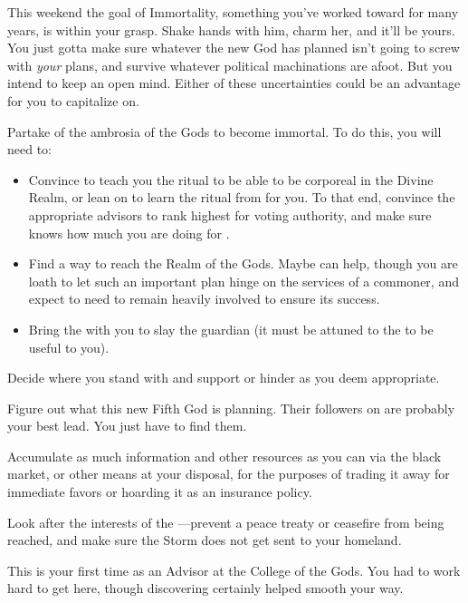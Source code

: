 \documentclass[char]{GL2020}
\begin{document}
This weekend the goal of Immortality, something you’ve worked toward for many years, is within your grasp. Shake hands with him, charm her, and it’ll be yours. You just gotta make sure whatever the new God has planned isn’t going to screw with \emph{your} plans, and survive whatever political machinations are afoot. But you intend to keep an open mind. Either of these uncertainties could be an advantage for you to capitalize on.


\begin{itemz}
	\item Partake of the ambrosia of the Gods to become immortal. To do this, you will need to:
	\begin{itemize}
		\item Convince \cDisney{} to teach you the ritual to be able to be corporeal in the Divine Realm, or lean on \cPirateChild{} to learn the ritual from \cDisney{\them} for you. To that end, convince the appropriate advisors to rank \cDisney{} highest for voting authority, and make sure \cDisney{} knows how much you are doing for \cDisney{\them}.
		\item Find a way to reach the Realm of the Gods. Maybe \cCurse{} can help, though you are loath to let such an important plan hinge on the services of a commoner, and expect to need to remain heavily involved to ensure its success.
		\item Bring the \iScythe{} with you to slay the guardian (it must be attuned to the \pFarm{} to be useful to you).
	\end{itemize}
	\item Decide where you stand with \cPrince{} and support or hinder \cPrince{\them} as you deem appropriate.
	\item Figure out what this new Fifth God is planning. Their followers on \pEarth{} are probably your best lead. You just have to find them.
	\item Accumulate as much information and other resources as you can via the black market, or other means at your disposal, for the purposes of trading it away for immediate favors or hoarding it as an insurance policy.
	\item Look after the interests of the \pFarm{}---prevent a peace treaty or ceasefire from being reached, and make sure the Storm does not get sent to your homeland.
\end{itemz}

\begin{itemz}[Notes]
	\item This is your first time as an Advisor at the College of the Gods. You had to work hard to get here, though discovering \cDisney{} certainly helped smooth your way.
\end{itemz}
\end{document}

